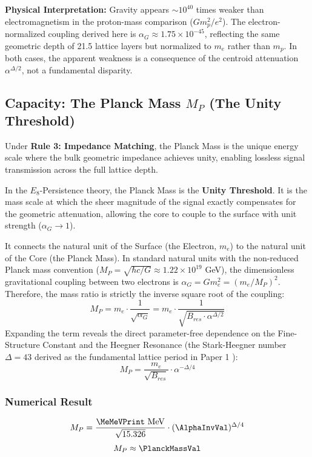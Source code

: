 \textbf{Physical Interpretation:} Gravity appears $\sim\!10^{40}$ times weaker than electromagnetism in the proton-mass comparison ($G m_p^2 / e^2$). The electron-normalized coupling derived here is $\alpha_G \approx 1.75 \times 10^{-45}$, reflecting the same geometric depth of 21.5 lattice layers but normalized to $m_e$ rather than $m_p$. In both cases, the apparent weakness is a consequence of the centroid attenuation $\alpha^{\Delta/2}$, not a fundamental disparity.

\subsection{Capacity: The Planck Mass \texorpdfstring{$M_P$}{MP} (The Unity Threshold)}
Under \textbf{Rule 3: Impedance Matching}, the Planck Mass is the unique energy scale where the bulk geometric impedance achieves unity, enabling lossless signal transmission across the full lattice depth.

In the $E_8$-Persistence theory, the Planck Mass is the \textbf{Unity Threshold}. It is the mass scale at which the sheer magnitude of the signal exactly compensates for the geometric attenuation, allowing the core to couple to the surface with unit strength ($\alpha_G \to 1$).

It connects the natural unit of the Surface (the Electron, $m_e$) to the natural unit of the Core (the Planck Mass). In standard natural units with the non-reduced Planck mass convention ($M_P = \sqrt{\hbar c / G} \approx 1.22 \times 10^{19}$ GeV), the dimensionless gravitational coupling between two electrons is $\alpha_G = G m_e^2 = (m_e/M_P)^2$. Therefore, the mass ratio is strictly the inverse square root of the coupling:
\begin{equation}
M_P = m_e \cdot \frac{1}{\sqrt{\alpha_G}} = m_e \cdot \frac{1}{\sqrt{B_{res} \cdot \alpha^{\Delta/2}}}
\end{equation}
Expanding the term reveals the direct parameter-free dependence on the Fine-Structure Constant and the Heegner Resonance (the Stark-Heegner number $\Delta=43$ derived as the fundamental lattice period in Paper 1 \cite{meyer_informational_2026}):
\begin{equation}
M_P = \frac{m_e}{\sqrt{B_{res}}} \cdot \alpha^{-\Delta/4}
\end{equation}

\subsubsection{Numerical Result}
\begin{equation}
M_P = \frac{\MeMeVPrint \text{ MeV}}{\sqrt{15.326}} \cdot (\AlphaInvVal)^{\Delta/4}
\end{equation}
\begin{equation}
M_P \approx \mathbf{\PlanckMassVal}
\end{equation}

